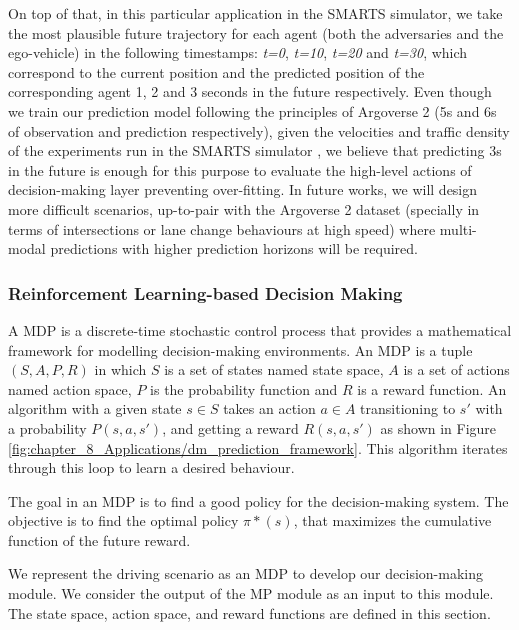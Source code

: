 On top of that, in this particular application in the \ac{SMARTS} simulator, we take the most plausible future trajectory for each agent (both the adversaries and the ego-vehicle) in the following timestamps: \textit{t=0}, \textit{t=10}, \textit{t=20} and \textit{t=30}, which correspond to the current position and the predicted position of the corresponding agent 1, 2 and 3 seconds in the future respectively. Even though we train our prediction model following the principles of Argoverse 2 (5s and 6s of observation and prediction respectively), given the velocities and traffic density of the experiments run in the \ac{SMARTS} simulator , we believe that predicting 3s in the future is enough for this purpose to evaluate the high-level actions of decision-making layer preventing over-fitting. In future works, we will design more difficult scenarios, up-to-pair with the Argoverse 2 dataset (specially in terms of intersections or lane change behaviours at high speed) where multi-modal predictions with higher prediction horizons will be required.

\subsubsection{Reinforcement Learning-based Decision Making}
\label{subsubsec:8_decision_making_our_approach_dm}

A \ac{MDP} is a discrete-time stochastic control process that provides a mathematical framework for modelling decision-making environments. An \ac{MDP} is a tuple $(S,A,P,R)$ in which $S$ is a set of states named state space, $A$ is a set of actions named action space, $P$ is the probability function and $R$ is a reward function. An algorithm with a given state $s \in S$ takes an action $a \in A$ transitioning to $s'$ with a probability $P(s,a,s')$, and getting a reward $R(s,a,s')$ as shown in Figure \ref{fig:chapter_8_Applications/dm_prediction_framework}. This algorithm iterates through this loop to learn a desired behaviour. 

The goal in an \ac{MDP} is to find a good policy for the decision-making system. The objective is to find the optimal policy $\pi*(s)$, that maximizes the cumulative function of the future reward.

We represent the driving scenario as an \ac{MDP} to develop our decision-making module. We consider the output of the MP module as an input to this module. The state space, action space, and reward functions are defined in this section.

